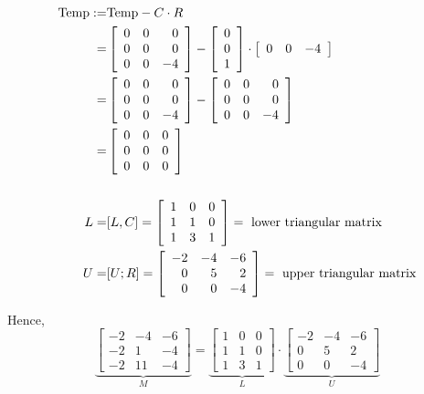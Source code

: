 \begin{align*}
    {\rm Temp} :=& {\rm Temp} - C \cdot R \\
    =& \left[ \begin{array}{rrr} 0 & 0 & 0 \\ 0 & 0 & 0 \\ 0 & 0 & -4 \end{array} \right] 
    - \left[ \begin{array}{r} 0 \\ 0 \\ 1 \end{array} \right] \cdot \left[ \begin{array}{rrr} 0 & 0 & -4 \end{array} \right] \\
    =& \left[ \begin{array}{rrr} 0 & 0 & 0 \\ 0 & 0 & 0 \\ 0 & 0 & -4 \end{array} \right] - \left[ \begin{array}{rrr} 0 & 0 & 0 \\ 0 & 0 & 0 \\ 0 & 0 & -4 \end{array} \right] \\
    =& \left[ \begin{array}{rrr} 0 & 0 & 0 \\ 0 & 0 & 0 \\ 0 & 0 & 0 \end{array} \right] \\
    \\
    L =& [L, C] = \left[ \begin{array}{rrr} 1 & 0 & 0 \\ 1 & 1 & 0 \\ 1 & 3 & 1 \end{array} \right] = ~\textrm{lower triangular matrix} \\
    U =& [U; R] = \left[ \begin{array}{rrr} -2 & -4 & -6 \\ 0 & 5 & 2 \\ 0 & 0 & -4 \end{array} \right] = ~\textrm{upper triangular matrix}
\end{align*}


Hence,
$$\underbrace{\left[\begin{array}{rrr} -2 & -4 & -6\\
-2 & 1 & -4 \\ -2 & 11 & -4 \end{array}\right]}_{M} =  \underbrace{\left[\begin{array}{rrr} 1 & 0 & 0\\ 1 & 1 & 0\\ 1 & 3  & 1\end{array} \right]}_{L} \cdot \underbrace{\left[\begin{array}{rrr} -2 & -4 & -6 \\ 0 & 5 &  2 \\ 0 &  0 & -4\end{array} \right]}_{U} $$


